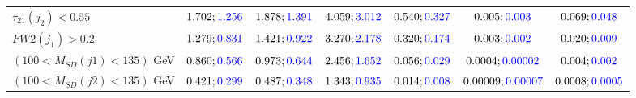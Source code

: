\begin{landscape}
\begin{table}
\begin{tabular}{lcccccc}
				\rowcolor{black!7}$\tau_{21}(j_2)<0.55$ &$1.702;\textcolor{blue}{1.256}$ &$1.878;\textcolor{blue}{1.391}$ &$4.059;\textcolor{blue}{3.012}$&$0.540;\textcolor{blue}{0.327}$&$0.005;\textcolor{blue}{0.003}$&$0.069;\textcolor{blue}{0.048}$\\
				$FW2(j_1)>0.2$ &$1.279;\textcolor{blue}{0.831}$ &$1.421;\textcolor{blue}{0.922}$&$3.270;\textcolor{blue}{2.178}$&$0.320;\textcolor{blue}{0.174}$&$0.003;\textcolor{blue}{0.002}$&$0.020;\textcolor{blue}{0.009}$\\
				\rowcolor{black!7}$(100<M_{SD}(j1)<135)$ GeV& $0.860;\textcolor{blue}{0.566}$&$0.973;\textcolor{blue}{0.644}$&$2.456;\textcolor{blue}{1.652}$&$0.056;\textcolor{blue}{0.029}$&$0.0004;\textcolor{blue}{0.00002}$&$0.004;\textcolor{blue}{0.002}$\\
				$(100<M_{SD}(j2)<135)$ GeV &$0.421;\textcolor{blue}{0.299}$ &$0.487;\textcolor{blue}{0.348}$ &$1.343;\textcolor{blue}{0.935}$&$0.014;\textcolor{blue}{0.008}$&$0.00009;\textcolor{blue}{0.00007}$&$0.0008;\textcolor{blue}{0.0005}$\\
				\bottomrule
			\end{tabular}
		\end{table}
		

\end{landscape}
